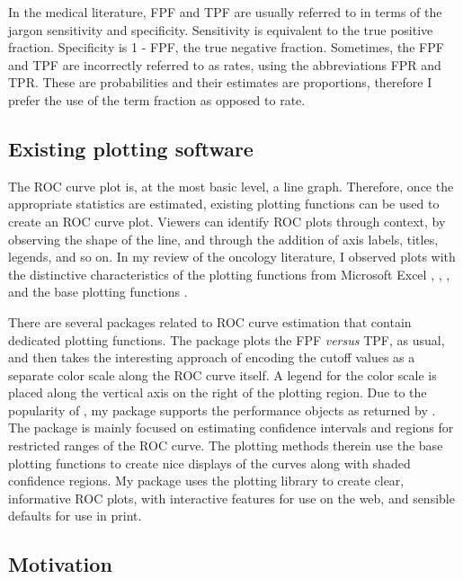 \documentclass[codesnippet]{jss}
\begin{document}
In the medical literature, FPF and TPF are usually referred to in terms
of the jargon sensitivity and specificity. Sensitivity is equivalent to
the true positive fraction. Specificity is 1 - FPF, the true negative
fraction. Sometimes, the FPF and TPF are incorrectly referred to as
rates, using the abbreviations FPR and TPR. These are probabilities and
their estimates are proportions, therefore I prefer the use of the term
fraction as opposed to rate.

\subsection{Existing plotting
software}\label{existing-plotting-software}

The ROC curve plot is, at the most basic level, a line graph. Therefore,
once the appropriate statistics are estimated, existing plotting
functions can be used to create an ROC curve plot. Viewers can identify
ROC plots through context, by observing the shape of the line, and
through the addition of axis labels, titles, legends, and so on. In my
review of the oncology literature, I observed plots with the distinctive
characteristics of the plotting functions from Microsoft Excel
\citep{excel},  \citep{sas},  \citep{spss},
and the base  plotting functions \citep{arr}.

There are several  packages related to ROC curve estimation
that contain dedicated plotting functions. The  package
\citep{rocr} plots the FPF \emph{versus} TPF, as usual, and then takes
the interesting approach of encoding the cutoff values as a separate
color scale along the ROC curve itself. A legend for the color scale is
placed along the vertical axis on the right of the plotting region. Due
to the popularity of , my package supports the performance
objects as returned by . The  package \citep{pROC}
is mainly focused on estimating confidence intervals and regions for
restricted ranges of the ROC curve. The plotting methods therein use the
base  plotting functions to create nice displays of the
curves along with shaded confidence regions. My  package
uses the  \citep{ggplot2} plotting library to create clear,
informative ROC plots, with interactive features for use on the web, and
sensible defaults for use in print.

\subsection{Motivation}\label{motivation}
\end{document}
